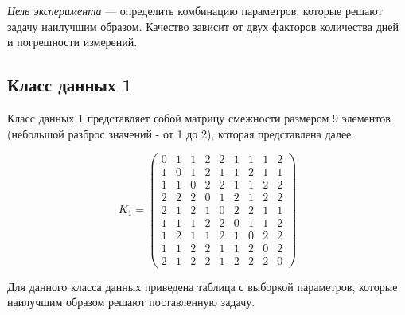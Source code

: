 \textit{Цель эксперимента} --- определить комбинацию параметров, которые решают задачу наилучшим образом. Качество зависит от двух факторов количества дней и погрешности измерений.


\subsection{Класс данных 1}

Класс данных 1 представляет собой матрицу смежности размером 9 элементов (небольшой разброс значений - от 1 до 2), которая представлена далее.

\begin{equation}
	\label{eq:kd1}
	K_{1} = \begin{pmatrix}
		0 & 1 & 1 & 2 & 2 & 1 & 1 & 1 & 2 \\ 
		1 & 0 & 1 & 2 & 1 & 1 & 2 & 1 & 1 \\ 
		1 & 1 & 0 & 2 & 2 & 1 & 1 & 2 & 2 \\ 
		2 & 2 & 2 & 0 & 1 & 2 & 1 & 2 & 2 \\ 
		2 & 1 & 2 & 1 & 0 & 2 & 2 & 1 & 1 \\ 
		1 & 1 & 1 & 2 & 2 & 0 & 1 & 1 & 2 \\ 
		1 & 2 & 1 & 1 & 2 & 1 & 0 & 2 & 2 \\ 
		1 & 1 & 2 & 2 & 1 & 1 & 2 & 0 & 2 \\ 
		2 & 1 & 2 & 2 & 1 & 2 & 2 & 2 & 0 
	\end{pmatrix}
\end{equation}

Для данного класса данных приведена таблица с выборкой параметров, которые наилучшим образом решают поставленную задачу.

